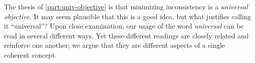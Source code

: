 % 
% 



The thesis of \cref{part:univ-objective} is that minimizing inconsistency is a \emph{universal objective}.  
It may seem plausible that this is a good idea, but what justifies calling it ``universal''?
Upon close examination, our usage of the word \emph{universal} 
    can be read in several different ways. 
Yet these different readings are closely related and reinforce one another; we argue that they are different aspects of a single coherent concept.
%

